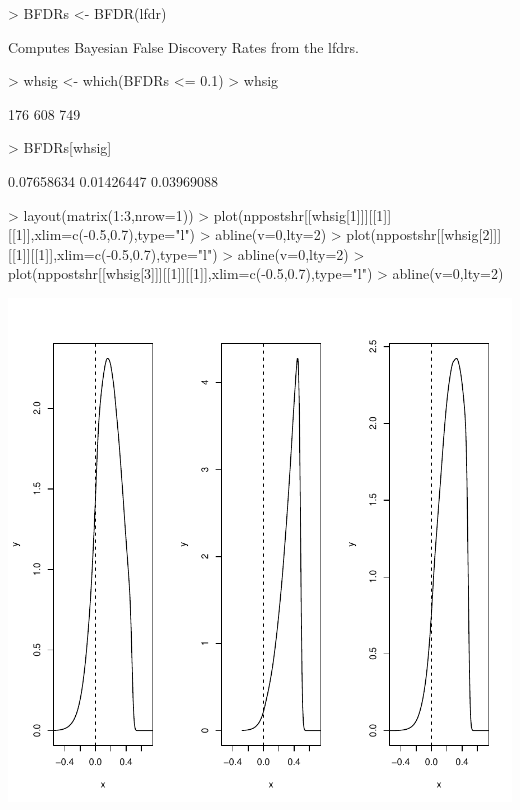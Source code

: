 \documentclass[11pt]{article}
\begin{document}
\begin{Schunk}
\begin{Sinput}
> BFDRs <- BFDR(lfdr)
\end{Sinput}
\end{Schunk}
Computes Bayesian False Discovery Rates \citep{Ventrucci} from
the lfdrs.

\begin{Schunk}
\begin{Sinput}
> whsig <- which(BFDRs <= 0.1)
> whsig
\end{Sinput}
\begin{Soutput}
[1] 176 608 749
\end{Soutput}
\begin{Sinput}
> BFDRs[whsig]
\end{Sinput}
\begin{Soutput}
[1] 0.07658634 0.01426447 0.03969088
\end{Soutput}
\begin{Sinput}
> layout(matrix(1:3,nrow=1))
> plot(nppostshr[[whsig[1]]][[1]][[1]],xlim=c(-0.5,0.7),type="l")
> abline(v=0,lty=2)
> plot(nppostshr[[whsig[2]]][[1]][[1]],xlim=c(-0.5,0.7),type="l")
> abline(v=0,lty=2)
> plot(nppostshr[[whsig[3]]][[1]][[1]],xlim=c(-0.5,0.7),type="l")
> abline(v=0,lty=2)
\end{Sinput}
\end{Schunk}
\includegraphics{ShrinkBayes-053}
\end{document}

